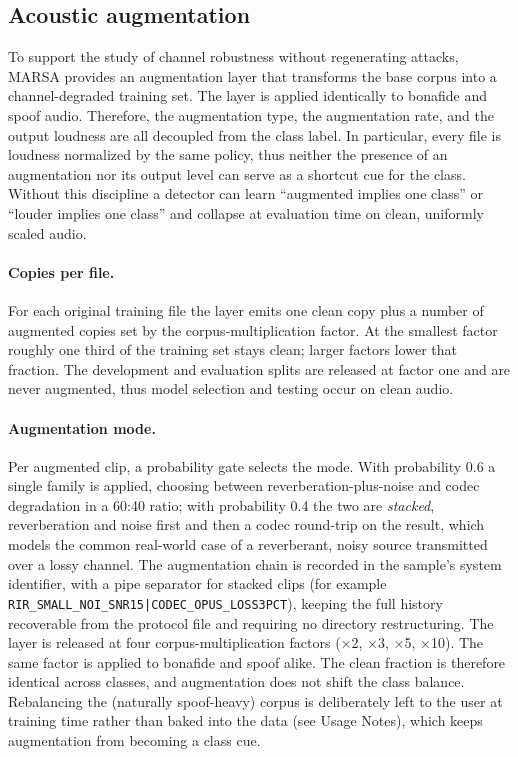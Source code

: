 \documentclass[11pt]{article}
\begin{document}

\subsection*{Acoustic augmentation}

To support the study of channel robustness without regenerating
attacks, MARSA provides an augmentation layer that transforms the base
corpus into a channel-degraded training set. The layer is applied
identically to bonafide and spoof audio. Therefore, the augmentation type, the augmentation rate, and
the output loudness are all decoupled from the class label. In particular,
every file is loudness normalized by the same policy, thus neither the presence of an
augmentation nor its output level can serve as a shortcut cue for the
class. Without this discipline a detector can learn ``augmented implies
one class'' or ``louder implies one class'' and collapse at evaluation
time on clean, uniformly scaled audio.

\paragraph{Copies per file.} For each original training file the layer
emits one clean copy plus a number of augmented copies set by the 
corpus-multiplication factor. At the smallest factor
roughly one third of the training set stays clean; larger factors lower
that fraction. The development and evaluation splits are released at
factor one and are never augmented, thus model selection and testing
occur on clean audio.

\paragraph{Augmentation mode.} Per augmented clip, a probability gate
selects the mode. With probability 0.6 a single family is applied,
choosing between reverberation-plus-noise and codec degradation in a
60:40 ratio; with probability 0.4 the two are \emph{stacked},
reverberation and noise first and then a codec round-trip on the result,
which models the common real-world case of a reverberant, noisy source
transmitted over a lossy channel. The augmentation chain is recorded in
the sample's system identifier, with a pipe separator for stacked clips
(for example \texttt{RIR\_SMALL\_NOI\_SNR15|CODEC\_OPUS\_LOSS3PCT}),
keeping the full history recoverable from the protocol file and
requiring no directory restructuring. The layer is released at four
corpus-multiplication factors ($\times$2, $\times$3, $\times$5,
$\times$10). The same factor is applied to bonafide and spoof alike. The
clean fraction is therefore identical across classes, and augmentation
does not shift the class balance. Rebalancing the (naturally spoof-heavy) corpus
is deliberately left to the user at training time rather than baked into
the data (see Usage Notes), which keeps augmentation from becoming a
class cue.
\end{document}

